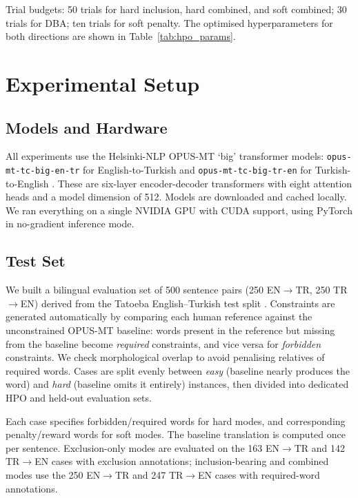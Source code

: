 \documentclass{tlp}
\begin{document}
Trial budgets: 50 trials for hard inclusion, hard combined, and soft combined; 30
trials for DBA; ten trials for soft penalty. The optimised hyperparameters for both
directions are shown in Table~\ref{tab:hpo_params}.

\section{Experimental Setup}

\subsection{Models and Hardware}

All experiments use the Helsinki-NLP OPUS-MT `big' transformer models:
\texttt{opus-mt-tc-big-en-tr} for English-to-Turkish and
\texttt{opus-mt-tc-big-tr-en} for Turkish-to-English
\citep{tiedemann2020opus,tiedemann2023democratizing}. These are six-layer
encoder-decoder transformers with eight attention heads and a model dimension of
512. Models are downloaded and cached locally. We ran everything on a single NVIDIA
GPU with CUDA support, using PyTorch \citep{paszke2019pytorch} in no-gradient
inference mode.

\subsection{Test Set}

We built a bilingual evaluation set of 500 sentence pairs (250 EN$\rightarrow$TR,
250 TR$\rightarrow$EN) derived from the Tatoeba English--Turkish test split
\citep{tiedemann2020tatoeba}. Constraints are generated automatically by comparing
each human reference against the unconstrained OPUS-MT baseline: words present in
the reference but missing from the baseline become \emph{required} constraints, and
vice versa for \emph{forbidden} constraints. We check morphological overlap to avoid
penalising relatives of required words. Cases are split evenly between \emph{easy}
(baseline nearly produces the word) and \emph{hard} (baseline omits it entirely)
instances, then divided into dedicated HPO and held-out evaluation sets.

Each case specifies forbidden/required words for hard modes, and corresponding
penalty/reward words for soft modes. The baseline translation is computed once per
sentence. Exclusion-only modes are evaluated on the 163 EN$\rightarrow$TR and 142
TR$\rightarrow$EN cases with exclusion annotations; inclusion-bearing and combined
modes use the 250 EN$\rightarrow$TR and 247 TR$\rightarrow$EN cases with
required-word annotations.
\end{document}
